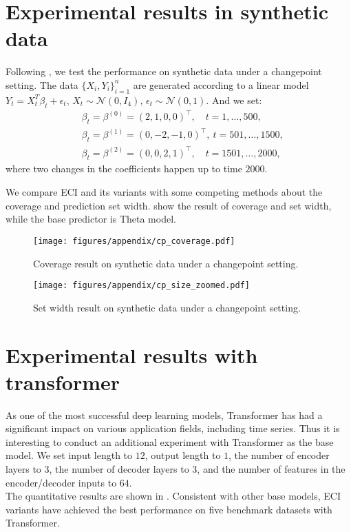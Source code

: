 \section{Experimental results in synthetic data}
\label{Experimental results in synthetic data}
Following \cite{barber2023conformal}, we test the performance on synthetic data under a changepoint setting. The data $\{X_i, Y_i\}_{i=1}^n$ are generated according to a linear model $Y_t = X_t^T \beta_t + \epsilon_t$, $X_t \sim \mathcal{N}(0, I_4)$, $\epsilon_t \sim \mathcal{N}(0,1)$. And we set:
$$\begin{aligned}
&\beta_t=\beta^{(0)}=(2,1,0,0)^\top,\quad t=1,\ldots,500, \\
&\beta_t=\beta^{(1)}=(0,-2,-1,0)^\top,\ t=501,\ldots,1500, \\
&\beta_t=\beta^{(2)}=(0,0,2,1)^\top,\quad t=1501,\ldots,2000,
\end{aligned}$$
where two changes in the coefficients happen up to time $2000$.

We compare ECI and its variants with some competing methods about the coverage and prediction set width.  show the result of coverage and set width, while the base predictor is Theta model.

\begin{figure*}[h]
  \centering
  \texttt{[image: figures/appendix/cp\_coverage.pdf]}
  \caption{Coverage result on synthetic data under a changepoint setting.}
  \label{changepoint coverage}
\end{figure*}
\begin{figure*}[h]
  \centering
  \texttt{[image: figures/appendix/cp\_size\_zoomed.pdf]}
  \caption{Set width result on synthetic data under a changepoint setting.}
  \label{changepoint set}
\end{figure*}


\section{Experimental results with transformer}
\label{Experimental results with Transformer}
As one of the most successful deep learning models, Transformer has had a significant impact on various application fields, including time series. Thus it is interesting to conduct an additional experiment with Transformer as the base model. We set input length to $12$, output length to $1$, the number of encoder layers to $3$, the number of decoder layers to $3$, and the number of features in the encoder/decoder inputs to $64$. 
\\
The quantitative results are shown in . Consistent with other base models, ECI variants have achieved the best performance on five benchmark datasets with Transformer.


